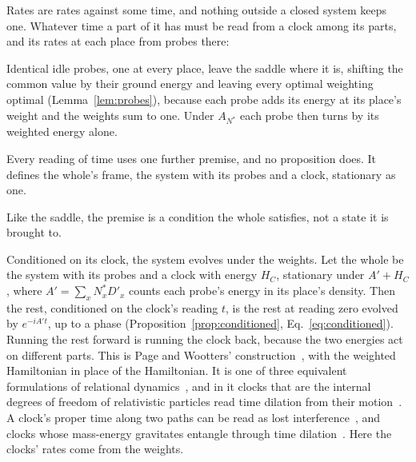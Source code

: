 \documentclass[aps,prd,reprint,superscriptaddress]{revtex4-2}
\begin{document}
Rates are rates against some time, and nothing outside a closed system keeps one. Whatever time a part of it has must be read from a clock among its parts, and its rates at each place from probes there:


Identical idle probes, one at every place, leave the saddle where it is, shifting the common value by their ground energy and leaving every optimal weighting optimal (Lemma~\ref{lem:probes}), because each probe adds its energy at its place's weight and the weights sum to one. Under $A_{N^*}$ each probe then turns by its weighted energy alone.

Every reading of time uses one further premise, and no proposition does. It defines the whole's frame, the system with its probes and a clock, stationary as one.


Like the saddle, the premise is a condition the whole satisfies, not a state it is brought to.

Conditioned on its clock, the system evolves under the weights. Let the whole be the system with its probes and a clock with energy $H_C$, stationary under $A' + H_C$, where $A' = \sum_x N^*_x D'_x$ counts each probe's energy in its place's density. Then the rest, conditioned on the clock's reading $t$, is the rest at reading zero evolved by $e^{-iA't}$, up to a phase (Proposition~\ref{prop:conditioned}, Eq.~\eqref{eq:conditioned}). Running the rest forward is running the clock back, because the two energies act on different parts. This is Page and Wootters' construction~\cite{PageWootters1983}, with the weighted Hamiltonian in place of the Hamiltonian. It is one of three equivalent formulations of relational dynamics~\cite{HoehnSmithLock2021}, and in it clocks that are the internal degrees of freedom of relativistic particles read time dilation from their motion~\cite{SmithAhmadi2020}. A clock's proper time along two paths can be read as lost interference~\cite{ZychEtAl2011}, and clocks whose mass-energy gravitates entangle through time dilation~\cite{CastroRuizEtAl2017}. Here the clocks' rates come from the weights.
\end{document}
